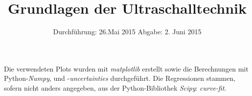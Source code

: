 
\subject{Anfängerpraktikum US1}
\title{Grundlagen der Ultraschalltechnik}
\date{
  Durchführung: 26.Mai 2015
  \hspace{3em}
  Abgabe: 2. Juni 2015
}


\maketitle
\newpage





\printbibliography
\noindent Die verwendeten Plots wurden mit \textit{matplotlib}\cite{matplotlib} erstellt sowie die Berechnungen mit Python-\textit{Numpy}\cite{numpy}, und -\textit{uncertainties}\cite{uncertainties} durchgeführt.
Die Regressionen stammen, sofern nicht anders angegeben, aus der Python-Bibliothek \textit{Scipy}\cite{scipy}: \emph{curve-fit}.

